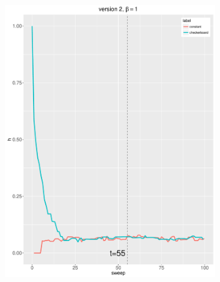 \documentclass[12pt, oneside]{article}   	%
\begin{document}
\begin{figure}[H]
\begin{subfigure}[b]{0.475\textwidth}
            \includegraphics[width=\textwidth, height=0.32\textheight]{v2_1.pdf}
        \end{subfigure}
\end{figure}
\end{document}
